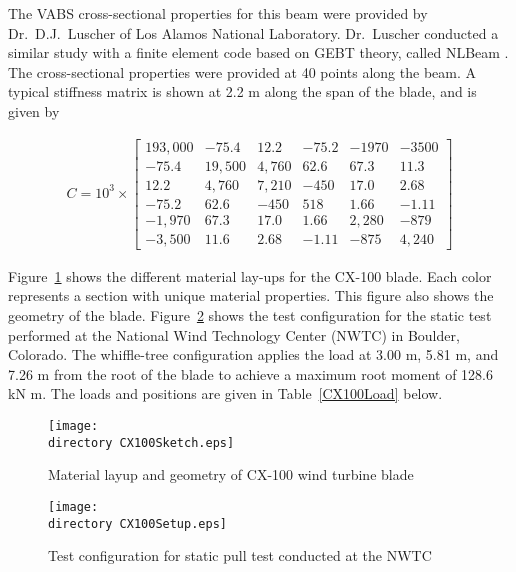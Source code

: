 \documentclass{aiaa-tc}
\def\directory{EPSF/}
\begin{document}
The VABS cross-sectional properties for this beam were provided by Dr.\ D.J.\ Luscher of Los Alamos National Laboratory. Dr.\ Luscher conducted a similar study with a finite element code based on GEBT theory, called NLBeam \cite{Luscher:2013}. The cross-sectional properties were provided at 40 points along the beam. A typical stiffness matrix is shown at 2.2 m along the span of the blade, and is given by

\begin{align*}
C =10^3 \times \begin{bmatrix}
	193,000 & -75.4   & 12.2   & -75.2  & -1970    & -3500    \\
	-75.4  & 19,500 & 4,760   & 62.6  & 67.3    & 11.3    \\
	12.2  & 4,760   & 7,210 & -450  & 17.0    & 2.68    \\
	-75.2  & 62.6   & -450   & 518 & 1.66    & -1.11    \\
	-1,970  & 67.3   & 17.0   & 1.66  & 2,280 & -879    \\
	-3,500  & 11.6   & 2.68   & -1.11  & -875    & 4,240
\end{bmatrix}
\end{align*}


Figure~\ref{CX100Sketch} \cite{paquette2006modeling} shows the different material lay-ups for the CX-100 blade. Each color represents a section with unique material properties. This figure also shows the geometry of the blade. Figure~\ref{CX100Setup} \cite{paquette2006modeling} shows the test configuration for the static test performed at the National Wind Technology Center (NWTC) in Boulder, Colorado. The whiffle-tree configuration applies the load at 3.00 m, 5.81 m, and 7.26 m from the root of the blade to achieve a maximum root moment of 128.6 kN m. The loads and positions are given in Table~\ref{CX100Load} below.
\begin{figure}
\centering
\texttt{[image: \\directory CX100Sketch.eps]}
\caption{Material layup and geometry of CX-100 wind turbine blade\cite{paquette2006modeling}} 
\label{CX100Sketch}
\end{figure}

\begin{figure}
\centering
\texttt{[image: \\directory CX100Setup.eps]}
\caption{Test configuration for static pull test conducted at the NWTC \cite{paquette2006modeling}} 
\label{CX100Setup}
\end{figure}
\end{document}
